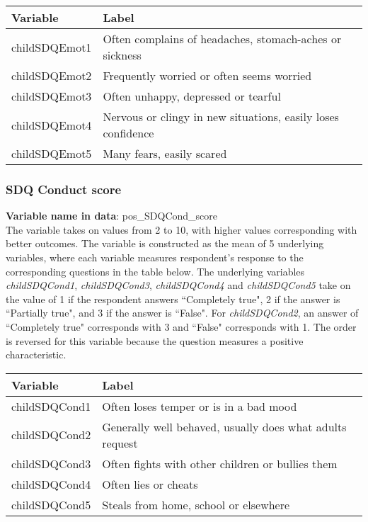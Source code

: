 \begin{table}[H]
\setlength{\tabcolsep}{20pt}
\begin{center}
\begin{tabular}{l l}
\hline
\textbf{Variable} & \textbf{Label} \\
\hline
childSDQEmot1 & Often complains of headaches, stomach-aches or sickness\\
childSDQEmot2 & Frequently worried or often seems worried\\
childSDQEmot3 & Often unhappy, depressed or tearful\\
childSDQEmot4 & Nervous or clingy in new situations, easily loses confidence\\
childSDQEmot5 & Many fears, easily scared\\
\hline
\end{tabular}
\end{center}
\end{table}

\subsubsection{SDQ Conduct score}
\textbf{Variable name in data}: pos\_SDQCond\_score \\[.3cm]
The variable takes on values from 2 to 10, with higher values corresponding with better outcomes. The variable is constructed as the mean of 5 underlying variables, where each variable measures respondent's response to the corresponding questions in the table below. The underlying variables \textit{childSDQCond1}, \textit{childSDQCond3}, \textit{childSDQCond4} and \textit{childSDQCond5} take on the value of 1 if the respondent answers  ``Completely true", 2 if the answer is ``Partially true", and 3 if the answer is ``False". For \textit{childSDQCond2}, an answer of ``Completely true" corresponds with 3 and ``False" corresponds with 1. The order is reversed for this variable because the question measures a positive characteristic.

\begin{table}[H]
\setlength{\tabcolsep}{20pt}
\begin{center}
\begin{tabular}{l l}
\hline
\textbf{Variable} & \textbf{Label} \\
\hline
childSDQCond1 & Often loses temper or is in a bad mood\\
childSDQCond2 &  Generally well behaved, usually does what adults request \\
childSDQCond3 & Often fights with other children or bullies them\\
childSDQCond4 & Often lies or cheats\\
childSDQCond5 & Steals from home, school or elsewhere\\
\hline
\end{tabular}
\end{center}
\end{table}

